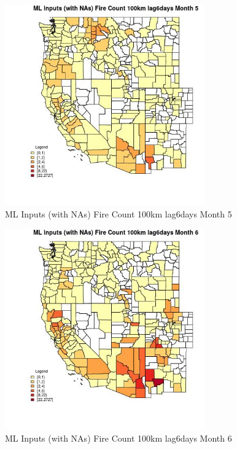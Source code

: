 \begin{figure} 
\centering  
\includegraphics[width=0.77\textwidth]{Code_Outputs/Report_ML_input_PM25_Step4_part_f_de_duplicated_aves_prioritize_24hr_obswNAs_CountyFire_Count_100km_lag6daysmedianMonth5.jpg} 
\caption{\label{fig:Report_ML_input_PM25_Step4_part_f_de_duplicated_aves_prioritize_24hr_obswNAsCountyFire_Count_100km_lag6daysmedianMonth5}ML Inputs (with NAs) Fire Count 100km lag6days Month 5} 
\end{figure} 
 

\begin{figure} 
\centering  
\includegraphics[width=0.77\textwidth]{Code_Outputs/Report_ML_input_PM25_Step4_part_f_de_duplicated_aves_prioritize_24hr_obswNAs_CountyFire_Count_100km_lag6daysmedianMonth6.jpg} 
\caption{\label{fig:Report_ML_input_PM25_Step4_part_f_de_duplicated_aves_prioritize_24hr_obswNAsCountyFire_Count_100km_lag6daysmedianMonth6}ML Inputs (with NAs) Fire Count 100km lag6days Month 6} 
\end{figure} 
 

